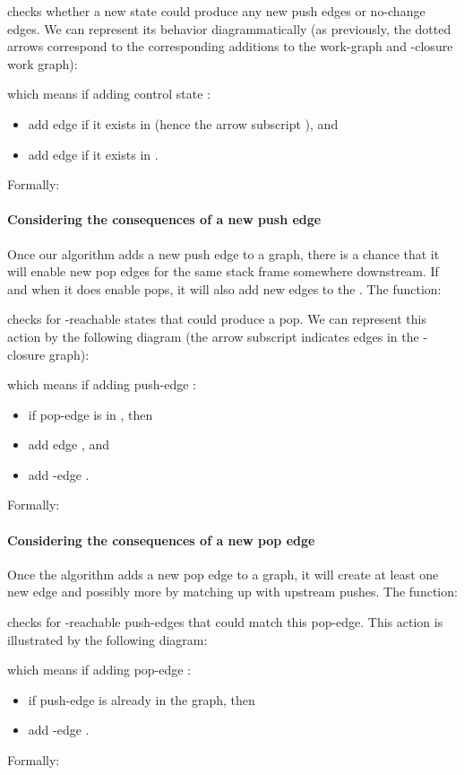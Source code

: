 checks whether a new state could produce any new push edges or no-change edges.
We can represent its behavior diagrammatically (as previously, the
dotted arrows correspond to the corresponding additions to the
work-graph and -closure work graph):

which means if adding control state :
\begin{itemize}
\item[] add edge  if it exists
  in  (hence the arrow subscript ), and
\item[] add edge  if it exists in  .
\end{itemize}
Formally:




\paragraph{Considering the consequences of a new push edge}
Once our algorithm adds a new push edge to a graph, there
is a chance that it will enable new pop edges for the same stack frame
somewhere downstream.
If and when it does enable pops, it will also add new edges to the
\ecg{}.
The  function:

checks for -reachable states that could produce a pop.
We can represent this action by the following diagram (the arrow
subscript  indicates edges in the -closure graph):

which means if adding push-edge :
\begin{itemize}
  \item[] if pop-edge  is in , then
  \item[] \hspace{1.5em} add edge , and
  \item[] \hspace{1.5em} add -edge .
\end{itemize}
Formally:



\paragraph{Considering the consequences of a new pop edge}
Once the algorithm adds a new pop edge to a graph, it will create 
at least one new \ecg{} edge and possibly more by matching up with
upstream pushes.
The  function:

checks for -reachable push-edges that could match this pop-edge.
This action is illustrated by the following diagram:

which means if adding pop-edge :
\begin{itemize}
 \item[] if push-edge  is already in the graph, then
 \item[] \hspace{1.5em} add -edge .
\end{itemize}
Formally:

